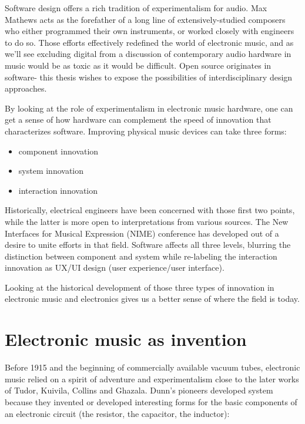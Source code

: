Software design offers a rich tradition of experimentalism for audio. Max Mathews acts as the forefather of a long line of extensively-studied composers who either programmed their own instruments, or worked closely with engineers to do so. Those efforts effectively redefined the world of electronic music, and as we'll see excluding digital from a discussion of contemporary audio hardware in music would be as toxic as it would be difficult. Open source originates in software- this thesis wishes to expose the possibilities of interdisciplinary design approaches. 

	By looking at the role of experimentalism in electronic music hardware, one can get a sense of how hardware can complement the speed of innovation that characterizes software. Improving physical music devices can take three forms:  
	
\begin{itemize}
	
\item component innovation

\item system innovation 

\item interaction innovation  

\end{itemize}

Historically, electrical engineers have been concerned with those first two points, while the latter is more open to interpretations from various sources. The New Interfaces for Musical Expression (NIME) conference has developed out of a desire to unite efforts in that field. Software affects all three levels, blurring the distinction between component and system while re-labeling the interaction innovation as UX/UI design (user experience/user interface). 

Looking at the historical development of those three types of innovation in electronic music and electronics gives us a better sense of where the field is today. 

\section{Electronic music as invention}

	Before 1915 and the beginning of commercially available vacuum tubes, electronic music relied on a spirit of adventure and experimentalism close to the later works of Tudor, Kuivila, Collins and Ghazala. Dunn's pioneers developed system because they invented or developed interesting forms for the basic components of an electronic circuit (the resistor, the capacitor, the inductor): 
	
